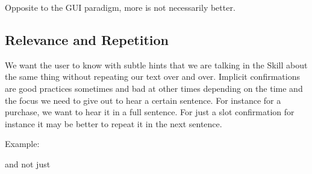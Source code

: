 Opposite to the GUI paradigm, more is not necessarily better.

\subsection*{Relevance and Repetition}

We want the user to know with subtle hints that we are talking in the Skill about the same thing without repeating our text over and over. Implicit confirmations are good practices sometimes and bad at other times depending on the time and the focus we need to give out to hear a certain sentence. For instance for a purchase, we want to hear it in a full sentence. For just a slot confirmation for instance it may be better to repeat it in the next sentence.

\noindent Example:




\begin{flushright}
\end{flushright}


\noindent and not just

\begin{flushright}
\end{flushright}


